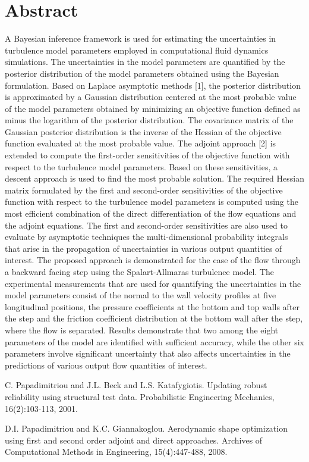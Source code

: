 \documentclass[article,A4,11pt]{llncs}%
\begin{document}
\section*{Abstract}
A Bayesian inference framework is used for estimating the uncertainties in turbulence model parameters employed in computational fluid dynamics simulations. The uncertainties in the model parameters are quantified by the posterior distribution of the model parameters obtained using the Bayesian formulation. Based on Laplace asymptotic methods [1], the posterior distribution is approximated by a Gaussian distribution centered at the most probable value of the model parameters obtained by minimizing an objective function defined as minus the logarithm of the posterior distribution. The covariance matrix of the Gaussian posterior distribution is the inverse of the Hessian of the objective function evaluated at the most probable value. The adjoint approach [2] is extended to compute the first-order sensitivities of the objective function with respect to the turbulence model parameters. Based on these sensitivities, a descent approach is used to find the most probable solution. The required Hessian matrix formulated by the first and second-order sensitivities of the objective function with respect to the turbulence model parameters is computed using the most efficient combination of the direct differentiation of the flow equations and the adjoint equations. The first and second-order sensitivities are also used to evaluate by asymptotic techniques the multi-dimensional probability integrals that arise in the propagation of uncertainties in various output quantities of interest. The proposed approach is demonstrated for the case of the flow through a backward facing step using the Spalart-Allmaras turbulence model. The experimental measurements that are used for quantifying the uncertainties in the model parameters consist of the normal to the wall velocity profiles at five longitudinal positions, the pressure coefficients at the bottom and top walls after the step and the friction coefficient distribution at the bottom wall after the step, where the flow is separated. Results demonstrate that two among the eight parameters of the model are identified with sufficient accuracy, while the other six parameters involve significant uncertainty that also affects uncertainties in the predictions of various output flow quantities of interest.


\begin{thebibliography}{10}
{\sc C. Papadimitriou and J.L. Beck and L.S. Katafygiotis}. {Updating robust reliability using structural test data}. Probabilistic Engineering Mechanics, 16(2):103-113, 2001.

{\sc D.I. Papadimitriou and K.C. Giannakoglou}. {Aerodynamic shape optimization using first and second order adjoint and direct approaches}. Archives of Computational Methods in Engineering, 15(4):447-488, 2008.
\end{thebibliography}
\end{document}
